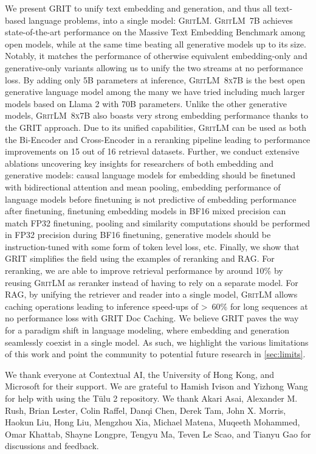 \documentclass{article}
\newcommand{\model}{\textsc{GritLM}}
\newcommand{\modelbase}{\textsc{GritLM~7B}}
\newcommand{\modelbig}{\textsc{GritLM~8x7B}}
\newcommand{\method}{\textsc{GRIT}}
\newcommand{\tulu}{T\"ulu}
\newcommand{\llama}{Llama}
\begin{document}
We present \method{} to unify text embedding and generation, and thus all text-based language problems, into a single model: \model{}. \modelbase{} achieves state-of-the-art performance on the Massive Text Embedding Benchmark among open models, while at the same time beating all generative models up to its size. Notably, it matches the performance of otherwise equivalent embedding-only and generative-only variants allowing us to unify the two streams at no performance loss. By adding only 5B parameters at inference, \modelbig{} is the best open generative language model among the many we have tried including much larger models based on \llama{} 2 with 70B parameters. Unlike the other generative models, \modelbig{} also boasts very strong embedding performance thanks to the \method{} approach. Due to its unified capabilities, \model{} can be used as both the Bi-Encoder and Cross-Encoder in a reranking pipeline leading to performance improvements on 15 out of 16 retrieval datasets. Further, we conduct extensive ablations uncovering key insights for researchers of both embedding and generative models: causal language models for embedding should be finetuned with bidirectional attention and mean pooling, embedding performance of language models before finetuning is not predictive of embedding performance after finetuning, finetuning embedding models in BF16 mixed precision can match FP32 finetuning, pooling and similarity computations should be performed in FP32 precision during BF16 finetuning, generative models should be instruction-tuned with some form of token level loss, etc. Finally, we show that \method{} simplifies the field using the examples of reranking and RAG. For reranking, we are able to improve retrieval performance by around 10\% by reusing \model{} as reranker instead of having to rely on a separate model. For RAG, by unifying the retriever and reader into a single model, \model{} allows caching operations leading to inference speed-ups of >~60\% for long sequences at no performance loss with \method{} Doc Caching. We believe \method{} paves the way for a paradigm shift in language modeling, where embedding and generation seamlessly coexist in a single model. As such, we highlight the various limitations of this work and point the community to potential future research in \autoref{sec:limits}.

\begin{ack}

We thank everyone at Contextual AI, the University of Hong Kong, and Microsoft for their support. We are grateful to Hamish Ivison and Yizhong Wang for help with using the \tulu{} 2 repository. We thank Akari Asai, Alexander M. Rush, Brian Lester, Colin Raffel, Danqi Chen, Derek Tam, John X. Morris, Haokun Liu, Hong Liu, Mengzhou Xia, Michael Matena, Muqeeth Mohammed, Omar Khattab, Shayne Longpre, Tengyu Ma, Teven Le Scao, and Tianyu Gao for discussions and feedback.

\end{ack}
\end{document}
